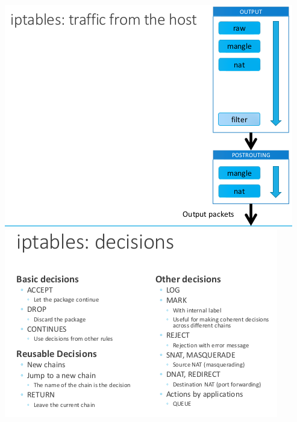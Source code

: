 \documentclass{article}
\begin{document}
\begin{center}
  \includegraphics[scale=0.35]{63}
  \includegraphics[scale=0.35]{64}
\end{center}
\end{document}
